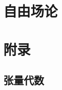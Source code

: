 \documentclass{article}
\begin{document}
\section{自由场论}
































\section{附录}
\subsection{张量代数}
\end{document}
